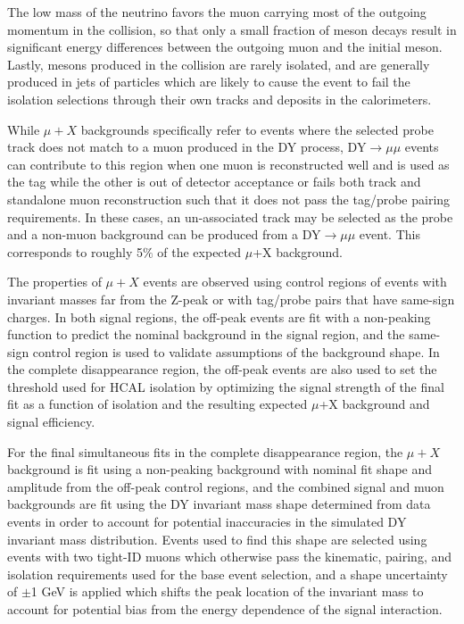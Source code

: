 The low mass of the neutrino favors the muon carrying most of the outgoing momentum in the collision, so that only a small fraction of meson decays result in significant energy differences between the outgoing muon and the initial meson.
Lastly, mesons produced in the collision are rarely isolated, and are generally produced in jets of particles which are likely to cause the event to fail the isolation selections through their own tracks and deposits in the calorimeters.

While $\mu+X$ backgrounds specifically refer to events where the selected probe track does not match to a muon produced in the DY process, DY$\rightarrow\mu\mu$ events can contribute to this region when one muon is reconstructed well and is used as the tag while the other is out of detector acceptance or fails both track and standalone muon reconstruction such that it does not pass the tag/probe pairing requirements. 
In these cases, an un-associated track may be selected as the probe and a non-muon background can be produced from a DY$\rightarrow\mu\mu$ event. 
This corresponds to roughly 5$\%$ of the expected $\mu$+X background.

The properties of $\mu+X$ events are observed using control regions of events with invariant masses far from the Z-peak or with tag/probe pairs that have same-sign charges.
In both signal regions, the off-peak events are fit with a non-peaking function to predict the nominal background in the signal region, and the same-sign control region is used to validate assumptions of the background shape.
In the complete disappearance region, the off-peak events are also used to set the threshold used for HCAL isolation by optimizing the signal strength of the final fit as a function of isolation and the resulting expected $\mu$+X background and signal efficiency.

For the final simultaneous fits in the complete disappearance region, the $\mu+X$ background is fit using a non-peaking background with nominal fit shape and amplitude from the off-peak control regions, and the combined signal and muon backgrounds are fit using the DY invariant mass shape determined from data events in order to account for potential inaccuracies in the simulated DY invariant mass distribution.
Events used to find this shape are selected using events with two tight-ID muons which otherwise pass the kinematic, pairing, and isolation requirements used for the base event selection, and a shape uncertainty of $\pm$1 GeV is applied which shifts the peak location of the invariant mass to account for potential bias from the energy dependence of the signal interaction.

